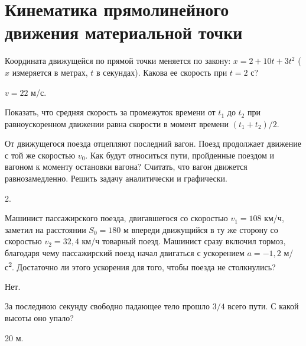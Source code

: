\section{Кинематика прямолинейного движения материальной точки}

\introProblems

\begin{ex} %
Координата движущейся по прямой точки меняется по закону: $x = 2 + 10t + 3t^2$ ($x$ измеряется в метрах, $t$ в секундах). Какова ее скорость при $t = 2$ с?
\begin{ans}
$v = 22$ м/с.
\end{ans}
\end{ex}

\begin{ex} %
Показать, что средняя скорость за промежуток времени от $t_1$ до $t_2$ при равноускоренном движении равна скорости в момент времени $(t_1 + t_2)/2$.
\end{ex}

\begin{ex} %
От движущегося поезда отцепляют последний вагон. Поезд продолжает движение с той же скоростью $v_0$. Как будут относиться пути, пройденные поездом и вагоном к моменту остановки вагона? Считать, что вагон движется равнозамедленно. Решить задачу аналитически и графически.
\begin{ans}
2.
\end{ans}
\end{ex}

\begin{ex} %
Машинист пассажирского поезда, двигавшегося со скоростью $v_1 = 108$ км/ч, заметил на расстоянии $S_0 = 180$ м впереди движущийся в ту же сторону со скоростью $v_2 = 32,4$ км/ч товарный поезд. Машинист сразу включил тормоз, благодаря чему пассажирский поезд начал двигаться с ускорением $a = -1,2$ м/с\textsuperscript{2}. Достаточно ли этого ускорения для того, чтобы поезда не столкнулись?
\begin{ans}
Нет.
\end{ans}
\end{ex}

\begin{ex} %
За последнюю секунду свободно падающее тело прошло $3/4$ всего пути. С какой высоты оно упало?
\begin{ans}
20 м.
\end{ans}
\end{ex}

\qualProblems

